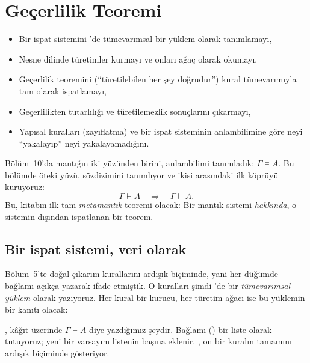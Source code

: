 \chapter{Geçerlilik Teoremi}\label{bol:gecerlilik}

\begin{bolumhedefleri}
\begin{itemize}
  \item Bir ispat sistemini \Lean{}'de tümevarımsal bir yüklem olarak
        tanımlamayı,
  \item Nesne dilinde türetimler kurmayı ve onları ağaç olarak okumayı,
  \item Geçerlilik teoremini (``türetilebilen her şey doğrudur'') kural
        tümevarımıyla tam olarak ispatlamayı,
  \item Geçerlilikten tutarlılığı ve türetilemezlik sonuçlarını
        çıkarmayı,
  \item Yapısal kuralları (zayıflatma) ve bir ispat sisteminin
        anlambilimine göre neyi ``yakalayıp'' neyi yakalayamadığını.
\end{itemize}
\end{bolumhedefleri}

Bölüm~10'da mantığın iki yüzünden birini, anlambilimi tanımladık:
$\Gamma \models A$. Bu bölümde öteki yüzü, sözdizimini tanımlıyor ve
ikisi arasındaki ilk köprüyü kuruyoruz:
\[
  \Gamma \vdash A \quad\Longrightarrow\quad \Gamma \models A.
\]
Bu, kitabın ilk tam \emph{metamantık} teoremi olacak: Bir mantık sistemi
\emph{hakkında}, o sistemin dışından ispatlanan bir teorem.

\section{Bir ispat sistemi, veri olarak}\label{sec:ispat-sistemi}

Bölüm~5'te doğal çıkarım kurallarını ardışık biçiminde, yani her
düğümde bağlamı açıkça yazarak ifade etmiştik. O kuralları şimdi
\Lean{}'de bir \emph{tümevarımsal yüklem} olarak yazıyoruz. Her kural bir
kurucu, her türetim ağacı ise bu yüklemin bir kanıtı olacak:


\noindent {}, kâğıt üzerinde $\Gamma \vdash A$ diye
yazdığımız şeydir. Bağlamı () bir liste olarak tutuyoruz;
yeni bir varsayım listenin başına eklenir. ,
on bir kuralın tamamını ardışık biçiminde gösteriyor.

